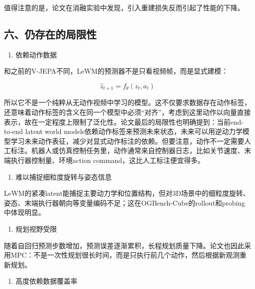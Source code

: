 值得注意的是，论文在消融实验中发现，引入重建损失反而引起了性能的下降。

\hypertarget{ux516dux4ecdux5b58ux5728ux7684ux5c40ux9650ux6027}{%
\subsection{六、仍存在的局限性}\label{ux516dux4ecdux5b58ux5728ux7684ux5c40ux9650ux6027}}

\begin{enumerate}
\def\labelenumi{\arabic{enumi}.}
\tightlist
\item
  依赖动作数据
\end{enumerate}

和之前的V-JEPA不同，LeWM的预测器不是只看视频帧，而是显式建模：

\[
\hat{z}_{t+1} = f_\theta(z_t, a_t)
\]

所以它不是一个纯粹从无动作视频中学习的模型。这不仅要求数据存在动作标签，还意味着动作标签的含义在同一个模型中必须``对齐''，考虑到这里动作以向量直接表示，故在一定程度上限制了泛化性。论文最后的局限性也明确提到：当前end-to-end latent world models依赖动作标签来预测未来状态，未来可以用逆动力学模型学习未来动作表征，减少对显式动作标注的依赖。但要注意，动作不一定需要人工标注。机器人或仿真控制任务里，动作通常来自控制器日志，比如关节速度、末端执行器控制量、环境action command，这比人工标注便宜得多。

\begin{enumerate}
\def\labelenumi{\arabic{enumi}.}
\setcounter{enumi}{1}
\tightlist
\item
  难以捕捉细粒度旋转与姿态信息
\end{enumerate}

LeWM的紧凑latent能捕捉主要动力学和位置结构，但对3D场景中的细粒度旋转、姿态、末端执行器朝向等变量编码不足；这在OGBench-Cube的rollout和probing中体现明显。

\begin{enumerate}
\def\labelenumi{\arabic{enumi}.}
\setcounter{enumi}{2}
\tightlist
\item
  规划视野受限
\end{enumerate}

随着自回归预测步数增加，预测误差逐渐累积，长程规划质量下降。论文也因此采用MPC：不是一次性规划很长时间，而是只执行前几个动作，然后根据新观测重新规划。

\begin{enumerate}
\def\labelenumi{\arabic{enumi}.}
\setcounter{enumi}{3}
\tightlist
\item
  高度依赖数据覆盖率
\end{enumerate}


